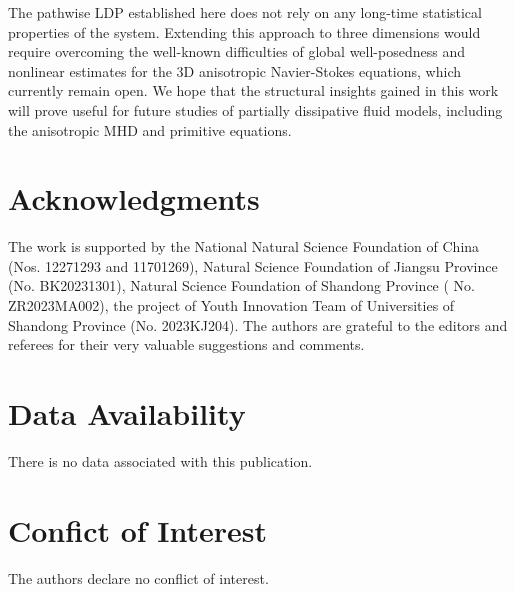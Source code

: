 \documentclass[11pt,a4paper,reqno]{amsart}
\theoremstyle{definition}
\begin{document}
The pathwise LDP established here does not rely on any long-time statistical
properties of the system.  Extending this approach to three dimensions would require
overcoming the well-known difficulties of global well-posedness and nonlinear
estimates for the 3D anisotropic Navier-Stokes equations, which currently
remain open.  We hope that the structural insights gained in this work will
prove useful for future studies of partially dissipative fluid models,
including the anisotropic MHD and primitive equations.


\section*{Acknowledgments}
The work is supported by the National Natural Science Foundation of China (Nos. 12271293  and  11701269), Natural Science Foundation of Jiangsu Province (No.  BK20231301),  Natural Science Foundation of Shandong Province ( No. ZR2023MA002), the project of Youth Innovation Team of Universities of Shandong Province (No. 2023KJ204). The authors are grateful to the editors and referees for their
very valuable suggestions and comments.

\section*{Data Availability}
There is no data associated with this publication.

\section*{Confict of Interest}
The authors declare no conflict of interest.
\end{document}
